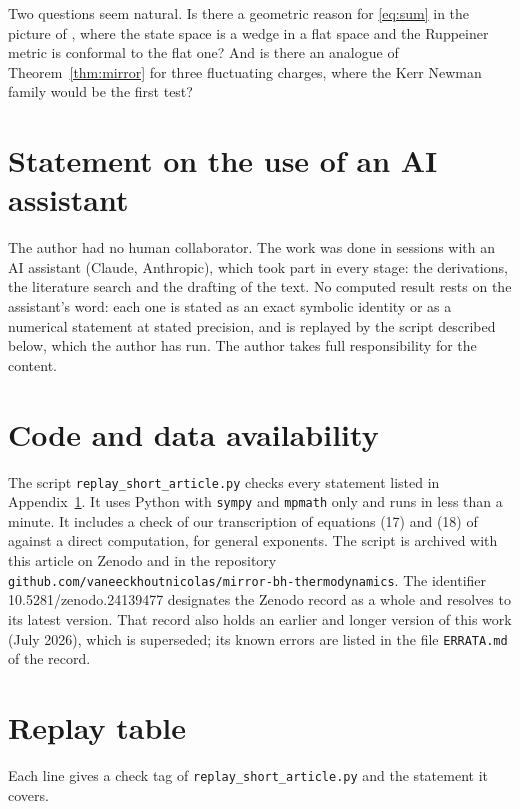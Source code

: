 \documentclass[11pt]{article}
\theoremstyle{definition}
\theoremstyle{remark}
\begin{document}
Two questions seem natural. Is there a geometric reason for \eqref{eq:sum} in the picture of \cite{ABP06,ABP15}, where the state space is a wedge in a flat space and the Ruppeiner metric is conformal to the flat one? And is there an analogue of Theorem~\ref{thm:mirror} for three fluctuating charges, where the Kerr Newman family would be the first test?

\section*{Statement on the use of an AI assistant}

The author had no human collaborator. The work was done in sessions with an AI assistant (Claude, Anthropic), which took part in every stage: the derivations, the literature search and the drafting of the text. No computed result rests on the assistant's word: each one is stated as an exact symbolic identity or as a numerical statement at stated precision, and is replayed by the script described below, which the author has run. The author takes full responsibility for the content.

\section*{Code and data availability}

The script \texttt{replay\_short\_article.py} checks every statement listed in Appendix~\ref{app:replay}. It uses Python with \texttt{sympy} and \texttt{mpmath} only and runs in less than a minute. It includes a check of our transcription of equations (17) and (18) of \cite{ABP06} against a direct computation, for general exponents. The script is archived with this article on Zenodo and in the repository \texttt{github.com/vaneeckhoutnicolas/mirror-bh-thermodynamics}. The identifier 10.5281/zenodo.24139477 designates the Zenodo record as a whole and resolves to its latest version. That record also holds an earlier and longer version of this work (July 2026), which is superseded; its known errors are listed in the file \texttt{ERRATA.md} of the record.

\appendix
\section{Replay table}\label{app:replay}

Each line gives a check tag of \texttt{replay\_short\_article.py} and the statement it covers.
\end{document}
